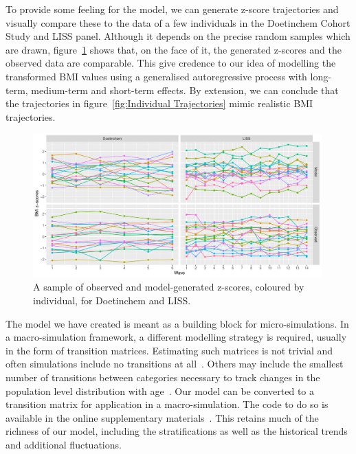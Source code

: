 \documentclass{imammb}
\numberwithin{equation}{section}
\begin{document}
To provide some feeling for the model, we can generate z-score trajectories and visually compare these to the data of a few individuals in the Doetinchem Cohort Study and LISS panel. Although it depends on the precise random samples which are drawn, figure~\ref{fig:Individual Z-Score Trajectories} shows that, on the face of it, the generated z-scores and the observed data are comparable. This give credence to our idea of modelling the transformed BMI values using a generalised autoregressive process with long-term, medium-term and short-term effects. By extension, we can conclude that the trajectories in figure~\ref{fig:Individual Trajectories} mimic realistic BMI trajectories.

\vspace{-4mm}

\begin{figure}[!h]
\centering\includegraphics[width=0.99\textwidth] {"Figures/Individual Z-Score Trajectories.pdf"}
\vspace{-1mm}
\caption{A sample of observed and model-generated z-scores, coloured by individual, for Doetinchem and LISS.}
\label{fig:Individual Z-Score Trajectories}
\vspace*{-9pt}
\end{figure}

The model we have created is meant as a building block for micro-simulations. In a macro-simulation framework, a different modelling strategy is required, usually in the form of transition matrices. Estimating such matrices is not trivial and often simulations include no transitions at all~\citep{Hendriksen2015}. Others may include the smallest number of transitions between categories necessary to track changes in the population level distribution with age~\citep{VandeKassteele2012}. Our model can be converted to a transition matrix for application in a macro-simulation. The code to do so is available in the online supplementary materials~\citep{Bogaardt2023}. This retains much of the richness of our model, including the stratifications as well as the historical trends and additional fluctuations.
\end{document}
